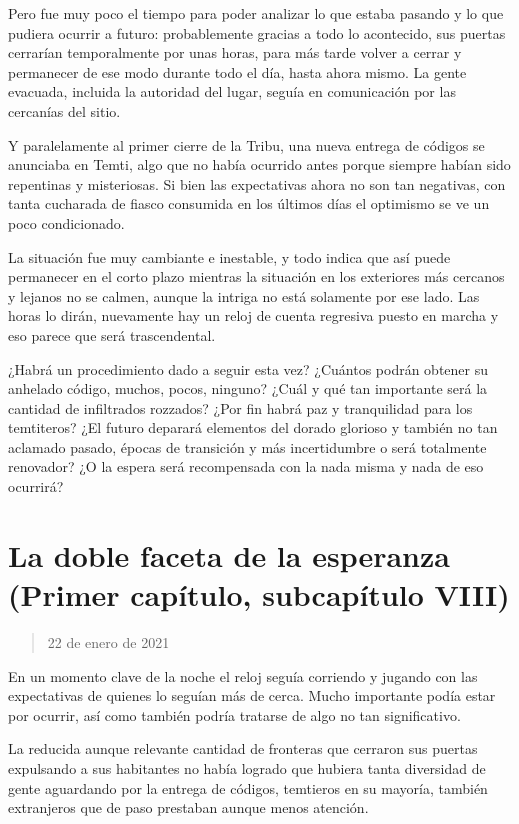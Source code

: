 \documentclass[
  spanish,
]{book}
\begin{document}
Pero fue muy poco el tiempo para poder analizar lo que estaba pasando y lo que pudiera ocurrir a futuro: probablemente gracias a todo lo acontecido, sus puertas cerrarían temporalmente por unas horas, para más tarde volver a cerrar y permanecer de ese modo durante todo el día, hasta ahora mismo. La gente evacuada, incluida la autoridad del lugar, seguía en comunicación por las cercanías del sitio.

Y paralelamente al primer cierre de la Tribu, una nueva entrega de códigos se anunciaba en Temti, algo que no había ocurrido antes porque siempre habían sido repentinas y misteriosas. Si bien las expectativas ahora no son tan negativas, con tanta cucharada de fiasco consumida en los últimos días el optimismo se ve un poco condicionado.

La situación fue muy cambiante e inestable, y todo indica que así puede permanecer en el corto plazo mientras la situación en los exteriores más cercanos y lejanos no se calmen, aunque la intriga no está solamente por ese lado. Las horas lo dirán, nuevamente hay un reloj de cuenta regresiva puesto en marcha y eso parece que será trascendental.

¿Habrá un procedimiento dado a seguir esta vez? ¿Cuántos podrán obtener su anhelado código, muchos, pocos, ninguno? ¿Cuál y qué tan importante será la cantidad de infiltrados rozzados? ¿Por fin habrá paz y tranquilidad para los temtiteros? ¿El futuro deparará elementos del dorado glorioso y también no tan aclamado pasado, épocas de transición y más incertidumbre o será totalmente renovador? ¿O la espera será recompensada con la nada misma y nada de eso ocurrirá?

\hypertarget{la-doble-faceta-de-la-esperanza-primer-capuxedtulo-subcapuxedtulo-viii}{%
\section{La doble faceta de la esperanza (Primer capítulo, subcapítulo VIII)}\label{la-doble-faceta-de-la-esperanza-primer-capuxedtulo-subcapuxedtulo-viii}}

\begin{quote}
22 de enero de 2021
\end{quote}

En un momento clave de la noche el reloj seguía corriendo y jugando con las expectativas de quienes lo seguían más de cerca. Mucho importante podía estar por ocurrir, así como también podría tratarse de algo no tan significativo.

La reducida aunque relevante cantidad de fronteras que cerraron sus puertas expulsando a sus habitantes no había logrado que hubiera tanta diversidad de gente aguardando por la entrega de códigos, temtieros en su mayoría, también extranjeros que de paso prestaban aunque menos atención.
\end{document}
